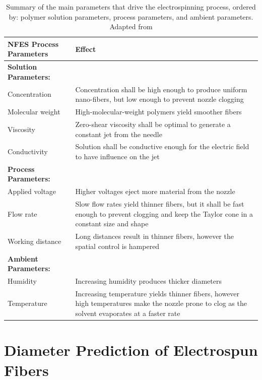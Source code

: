 \begin{table}[ht]
\centering
\caption[Near-Field Electrospinning Process Parameters]{Summary of the main parameters that drive the electrospinning process, ordered by: polymer solution parameters, process parameters, and ambient parameters. Adapted from \cite{Bagbi2019, Unnithan2015}}
\begin{tabularx}{\textwidth}{lX}
\hline
\textbf{NFES Process Parameters} & \textbf{Effect} \\
\hline
\textbf{Solution Parameters:} &  \\
Concentration & Concentration shall be high enough to produce uniform nano-fibers, but low enough to prevent nozzle clogging \\
Molecular weight & High-molecular-weight polymers yield smoother fibers \\
Viscosity & Zero-shear viscosity shall be optimal to generate a constant jet from the needle \\
Conductivity & Solution shall be conductive enough for the electric field to have influence on the jet \\
\textbf{Process Parameters:} &  \\
Applied voltage & Higher voltages eject more material from the nozzle \\
Flow rate & Slow flow rates yield thinner fibers, but it shall be fast enough to prevent clogging and keep the Taylor cone in a constant size and shape \\
Working distance & Long distances result in thinner fibers, however the spatial control is hampered \\
\textbf{Ambient Parameters:} &  \\
Humidity & Increasing humidity produces thicker diameters \\
Temperature & Increasing temperature yields thinner fibers, however high temperatures make the nozzle prone to clog as the solvent evaporates at a faster rate \\
\hline
\end{tabularx}
\label{tab:nfesProcessParameters}
\end{table}

\section{Diameter Prediction of Electrospun Fibers} %


